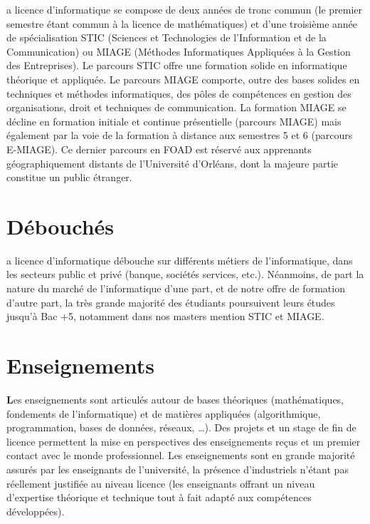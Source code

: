 \documentclass[10pt, a5paper]{report}
\begin{document}
\begin{spacing}{1.5}
{\begin{wrapfigure}{r}{0.35\textwidth}
\begin{center}
            \end{center}
            \vspace{-20pt}
      \end{wrapfigure}
a licence d’informatique se compose de deux années de tronc commun (le premier semestre étant commun à la licence de mathématiques) et d’une troisième année de spécialisation STIC (Sciences et Technologies de l’Information et de la Communication) ou MIAGE (Méthodes Informatiques Appliquées à la Gestion des Entreprises).
Le parcours STIC offre une formation solide en informatique théorique et appliquée. 
Le parcours MIAGE comporte, outre des bases solides en techniques et méthodes informatiques, des pôles de compétences en gestion des organisations, droit et techniques de communication. 
La formation MIAGE se décline en formation initiale et continue présentielle (parcours MIAGE) mais également par la voie de la formation à distance aux semestres 5 et 6 (parcours E-MIAGE). Ce dernier parcours en FOAD est réservé aux apprenants géographiquement distants de l’Université d’Orléans, dont la majeure partie constitue un public étranger.

\section*{Débouchés}
a licence d’informatique débouche sur différents métiers de l’informatique, dans les secteurs public et privé (banque, sociétés services, etc.). Néanmoins, de part la nature du marché de l’informatique d’une part, et de notre offre de formation d’autre part, la très grande majorité des étudiants poursuivent leurs études jusqu’à Bac +5, notamment dans nos masters mention STIC et MIAGE.

\section*{Enseignements}
\textcolor{couleurFonce}{\textbf{\Large{L}}}es enseignements sont articulés autour de bases théoriques (mathématiques, fondements de l’informatique) et de matières appliquées (algorithmique, programmation, bases de données, réseaux, …). Des projets et un stage de fin de licence permettent la mise en perspectives des enseignements reçus et un premier contact avec le monde professionnel.
Les enseignements sont en grande majorité assurés par les enseignants de l’université, la présence d’industriels n’étant pas réellement justifiée au niveau licence (les enseignants offrant un niveau d’expertise théorique et technique tout à fait adapté aux compétences développées).

}
\end{spacing}
\end{document}
